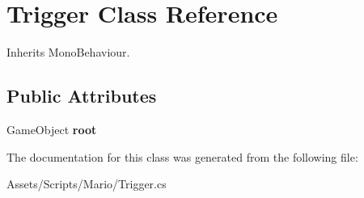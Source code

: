 \hypertarget{class_trigger}{\section{Trigger Class Reference}
\label{class_trigger}
}


Inherits Mono\-Behaviour.

\subsection*{Public Attributes}
\begin{DoxyCompactItemize}
\item 
\hypertarget{class_trigger_ad13c79cf269a400c9d94957fe1f6661a}{Game\-Object {\bfseries root}}\label{class_trigger_ad13c79cf269a400c9d94957fe1f6661a}

\end{DoxyCompactItemize}


The documentation for this class was generated from the following file\-:\begin{DoxyCompactItemize}
\item 
Assets/\-Scripts/\-Mario/Trigger.\-cs\end{DoxyCompactItemize}
